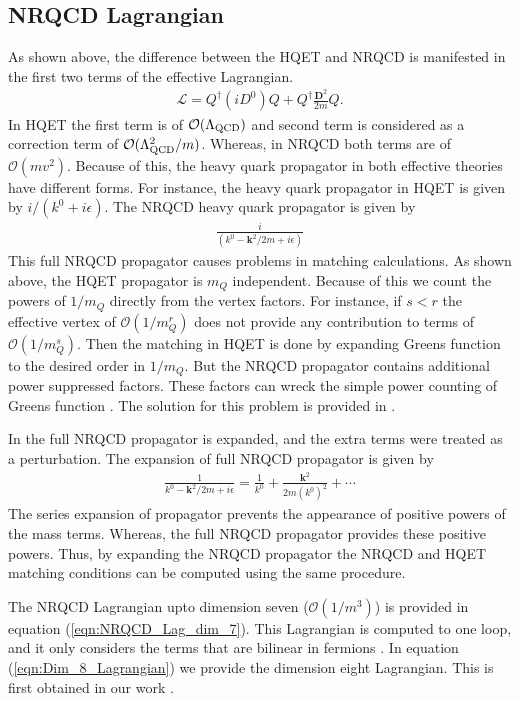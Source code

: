 \subsection{NRQCD Lagrangian}
As shown above, the difference between the HQET and NRQCD is manifested in the first two terms of the effective Lagrangian.
\begin{eqnarray}
\mathcal{L}=Q^{\dagger}(iD^{0})Q+Q^{\dagger}\frac{\bm{D}^2}{2m}Q.
\end{eqnarray} 
In HQET the first term is of $\mathcal{O}(\Lambda_{\rm{QCD}})$ and second term is considered as a correction term of $\mathcal{O}(\Lambda^{2}_{\rm{QCD}}/m)$. Whereas, in NRQCD both terms are of $\mathcal{O}(mv^2)$. Because of this, the heavy quark propagator in both effective theories have different forms. For instance, the heavy quark propagator in HQET is given by $i /\left(k^{0}+i \epsilon\right)$. The NRQCD heavy quark propagator is given by
\begin{eqnarray}\label{eqn:NRQCD_propagator}
\frac{i}{\left(k^{0}-\mathbf{k}^{2} / 2 m+i \epsilon\right)}
\end{eqnarray}
This full NRQCD propagator causes problems in matching calculations. As shown above, the HQET propagator is $m_Q$ independent. Because of this we count the powers of $1/m_Q$ directly from the vertex factors.  For instance, if $s<r$ the effective vertex of $\mathcal{O}(1/m_Q^r)$ does not provide any contribution to terms of $\mathcal{O}(1/m_Q^s)$. Then the matching in HQET is done by expanding Greens function to the desired order in $1/m_Q$. But the NRQCD propagator contains additional power suppressed factors. These factors can wreck the simple power counting of Greens function \cite{Petrov:2016azi}. The solution for this problem is provided in  \cite{Manohar:1997qy}.\par
In \cite{Manohar:1997qy} the full NRQCD propagator is expanded, and the extra terms were treated as a perturbation. The expansion of full NRQCD propagator is given by
\begin{eqnarray}
\frac{1}{k^{0}-\mathbf{k}^{2} / 2 m+i \epsilon}=\frac{1}{k^{0}}+\frac{\mathbf{k}^{2}}{2 m\left(k^{0}\right)^{2}}+\cdots
\end{eqnarray}
The series expansion of propagator prevents the appearance of positive powers of the mass terms. Whereas, the full NRQCD propagator provides these positive powers. Thus, by expanding the NRQCD propagator the NRQCD and HQET matching conditions can be computed using the same procedure.\par
The NRQCD Lagrangian upto dimension seven ($\mathcal{O}(1/m^3)$) is provided in equation (\ref{eqn:NRQCD_Lag_dim_7}). 
This Lagrangian is computed to one loop, and it only considers the terms that are bilinear in fermions \cite{Manohar:1997qy}. In equation (\ref{eqn:Dim_8_Lagrangian}) we provide the dimension eight Lagrangian. This is first obtained in our work \cite{Gunawardana:2017zix}.
 
